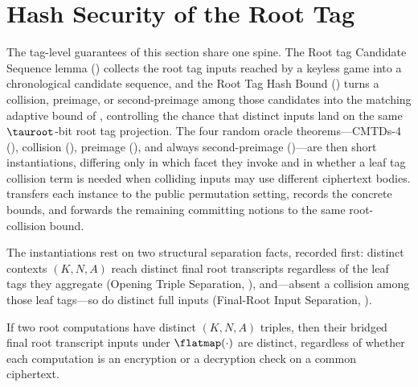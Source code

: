 \section{Hash Security of the Root Tag}
\label{sec:cmtds3}

The tag-level guarantees of this section share one spine. The Root tag
Candidate Sequence lemma () collects the
root tag inputs reached by a keyless game into a chronological candidate
sequence, and the Root Tag Hash Bound () turns a
collision, preimage, or second-preimage among those candidates into the
matching adaptive bound of , controlling the chance that
distinct inputs land on the same $\tauroot$-bit root tag projection. The
four random oracle theorems---CMTDs-4 (), collision
(), preimage (), and
always second-preimage ()---are then short
instantiations, differing only in which facet they invoke and in whether
a leaf tag collision term is needed when colliding inputs may use
different ciphertext bodies.  transfers each
instance to the public permutation setting,  records
the concrete bounds, and  forwards the
remaining \cite{BH22} committing notions to the same root-collision
bound.

The instantiations rest on two structural separation facts, recorded
first: distinct contexts $(K, N, A)$ reach distinct final root
transcripts regardless of the leaf tags they aggregate (Opening Triple
Separation, ), and---absent a collision among those
leaf tags---so do distinct full inputs (Final-Root Input Separation,
).

\begin{proposition}
\label{cor:triple-sep}
If two \TW{} root computations have distinct $(K, N, A)$ triples, then
their bridged final root transcript inputs under $\flatmap(\cdot)$ are
distinct, regardless of whether each computation is an encryption or
a decryption check on a common ciphertext.
\end{proposition}

